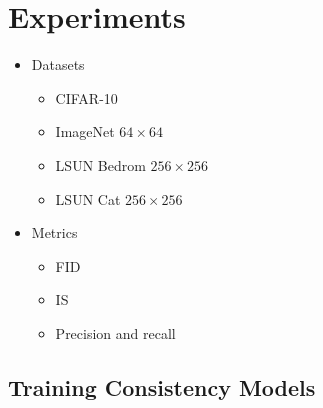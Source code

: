 \documentclass[10pt]{article}
\begin{document}
\section{Experiments}

\begin{itemize}
  \item Datasets
  \begin{itemize}
    \item CIFAR-10
    \item ImageNet $64 \times 64$
    \item LSUN Bedrom $256 \times 256$
    \item LSUN Cat $256 \times 256$
  \end{itemize} 
  \item Metrics
  \begin{itemize}
    \item FID
    \item IS
    \item Precision and recall \cite{Kynkaanniemi:2019}
  \end{itemize}
\end{itemize}

\subsection{Training Consistency Models}
\end{document}
